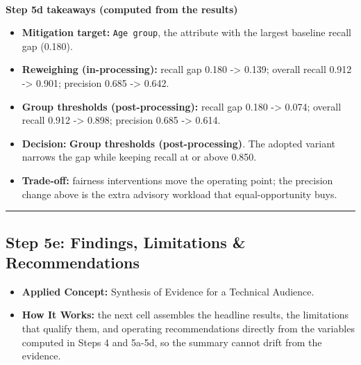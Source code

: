 \documentclass[11pt]{article}
\providecommand{\tightlist}{%
      \setlength{\itemsep}{0pt}\setlength{\parskip}{0pt}}
\begin{document}
    \begin{center}
    \end{center}
    { \hspace*{\fill} \\}
    
    \textbf{Step 5d takeaways (computed from the results)}

\begin{itemize}
\tightlist
\item
  \textbf{Mitigation target:} \texttt{Age\ group}, the attribute with
  the largest baseline recall gap (0.180).
\item
  \textbf{Reweighing (in-processing):} recall gap 0.180 -\textgreater{}
  0.139; overall recall 0.912 -\textgreater{} 0.901; precision 0.685
  -\textgreater{} 0.642.
\item
  \textbf{Group thresholds (post-processing):} recall gap 0.180
  -\textgreater{} 0.074; overall recall 0.912 -\textgreater{} 0.898;
  precision 0.685 -\textgreater{} 0.614.
\item
  \textbf{Decision:} \textbf{Group thresholds (post-processing)}. The
  adopted variant narrows the gap while keeping recall at or above
  0.850.
\item
  \textbf{Trade-off:} fairness interventions move the operating point;
  the precision change above is the extra advisory workload that
  equal-opportunity buys.
\end{itemize}

    
    \begin{center}\rule{0.5\linewidth}{0.5pt}\end{center}

\hypertarget{step-5e-findings-limitations-recommendations}{%
\subsection{Step 5e: Findings, Limitations \&
Recommendations}\label{step-5e-findings-limitations-recommendations}}

\begin{itemize}
\tightlist
\item
  \textbf{Applied Concept:} Synthesis of Evidence for a Technical
  Audience.
\item
  \textbf{How It Works:} the next cell assembles the headline results,
  the limitations that qualify them, and operating recommendations
  directly from the variables computed in Steps 4 and 5a-5d, so the
  summary cannot drift from the evidence.
\end{itemize}
\end{document}
